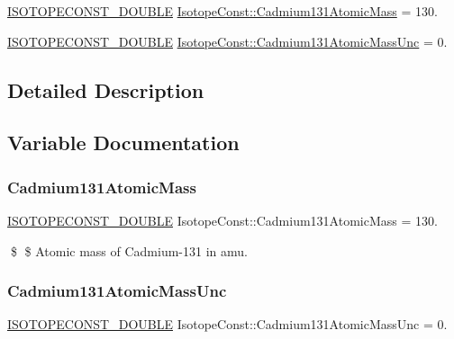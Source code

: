 \begin{DoxyCompactItemize}
\item 
\mbox{\hyperlink{group___isotope_const-_macros_ga8f45a7272ce02c0b4c65c44636ed719a}{I\+S\+O\+T\+O\+P\+E\+C\+O\+N\+S\+T\+\_\+\+D\+O\+U\+B\+LE}} \mbox{\hyperlink{group___isotope_const-_cadmium-_cd131_ga38e2fde429523485b3fc3d55b76ac727}{Isotope\+Const\+::\+Cadmium131\+Atomic\+Mass}} = 130.
\item 
\mbox{\hyperlink{group___isotope_const-_macros_ga8f45a7272ce02c0b4c65c44636ed719a}{I\+S\+O\+T\+O\+P\+E\+C\+O\+N\+S\+T\+\_\+\+D\+O\+U\+B\+LE}} \mbox{\hyperlink{group___isotope_const-_cadmium-_cd131_gad5dfd7c7285588d3429a4ad4b5876f2d}{Isotope\+Const\+::\+Cadmium131\+Atomic\+Mass\+Unc}} = 0.
\end{DoxyCompactItemize}


\subsection{Detailed Description}


\subsection{Variable Documentation}
\mbox{\label{group___isotope_const-_cadmium-_cd131_ga38e2fde429523485b3fc3d55b76ac727}} 
\subsubsection{\texorpdfstring{Cadmium131\+Atomic\+Mass}{Cadmium131AtomicMass}}
{\footnotesize\ttfamily \mbox{\hyperlink{group___isotope_const-_macros_ga8f45a7272ce02c0b4c65c44636ed719a}{I\+S\+O\+T\+O\+P\+E\+C\+O\+N\+S\+T\+\_\+\+D\+O\+U\+B\+LE}} Isotope\+Const\+::\+Cadmium131\+Atomic\+Mass = 130.}

\$ \$ Atomic mass of Cadmium-\/131 in amu. \mbox{\label{group___isotope_const-_cadmium-_cd131_gad5dfd7c7285588d3429a4ad4b5876f2d}} 
\subsubsection{\texorpdfstring{Cadmium131\+Atomic\+Mass\+Unc}{Cadmium131AtomicMassUnc}}
{\footnotesize\ttfamily \mbox{\hyperlink{group___isotope_const-_macros_ga8f45a7272ce02c0b4c65c44636ed719a}{I\+S\+O\+T\+O\+P\+E\+C\+O\+N\+S\+T\+\_\+\+D\+O\+U\+B\+LE}} Isotope\+Const\+::\+Cadmium131\+Atomic\+Mass\+Unc = 0.}

